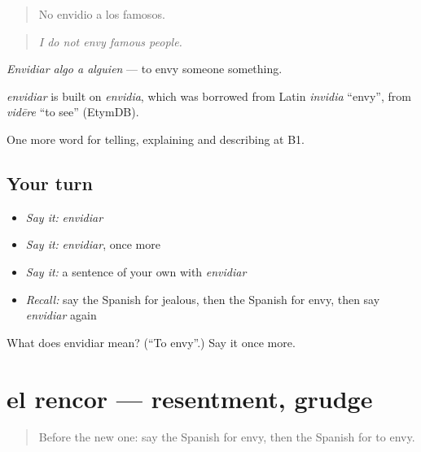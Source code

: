 \begin{quote}
No envidio a los famosos.
\end{quote}

\begin{quote}
\emph{I do not envy famous people.}
\end{quote}

\emph{Envidiar algo a alguien} — to envy someone something.

\begin{cousinweb}
\emph{envidiar} is built on \emph{envidia}, which was borrowed from Latin \emph{invidia} \textquotedblleft{}envy\textquotedblright{}, from \emph{vidēre} \textquotedblleft{}to see\textquotedblright{} (EtymDB).
\end{cousinweb}

\begin{grammarlens}[title={What you've built}]
One more word for telling, explaining and describing at B1.
\end{grammarlens}

\subsection*{Your turn}
\begin{itemize}
\raggedright
  \item \emph{Say it:} \emph{envidiar}
  \item \emph{Say it:} \emph{envidiar}, once more
  \item \emph{Say it:} a sentence of your own with \emph{envidiar}
  \item \emph{Recall:} say the Spanish for jealous, then the Spanish for envy, then say \emph{envidiar} again
\end{itemize}

\begin{tcolorbox}[breakable,colback=teal!4,colframe=teal!35!black,title={Before you move on}]
What does envidiar mean? (\textquotedblleft{}To envy\textquotedblright{}.) Say it once more.
\end{tcolorbox}
\section[el rencor]{el rencor — resentment, grudge}

\label{lesson:ES-C708-rencor}



\begin{quote}
Before the new one: say the Spanish for envy, then the Spanish for to envy.
\end{quote}

